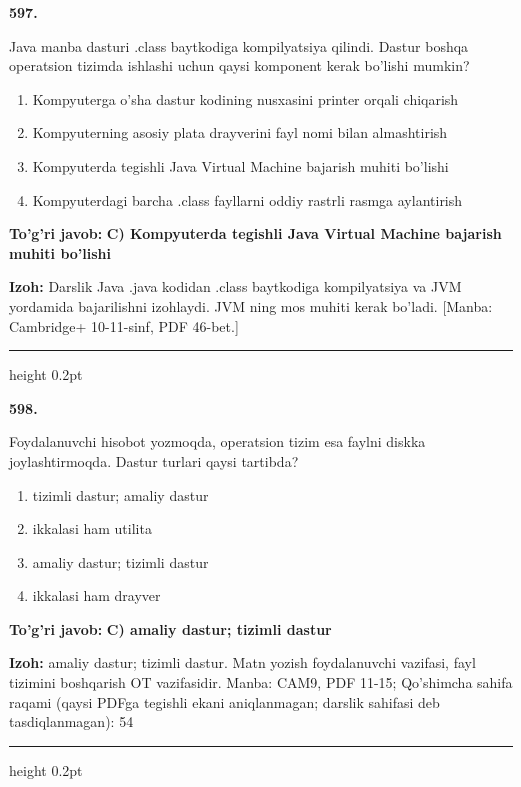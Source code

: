 \documentclass[10pt,a4paper]{article}
\begin{document}
{\bfseries\sffamily\color{ink} 597.}
\par
Java manba dasturi .class baytkodiga kompilyatsiya qilindi. Dastur boshqa operatsion tizimda ishlashi uchun qaysi komponent kerak bo'lishi mumkin?
\begin{enumerate}[label=\Alph*),leftmargin=9mm]
\item Kompyuterga o'sha dastur kodining nusxasini printer orqali chiqarish
\item Kompyuterning asosiy plata drayverini fayl nomi bilan almashtirish
\item Kompyuterda tegishli Java Virtual Machine bajarish muhiti bo'lishi
\item Kompyuterdagi barcha .class fayllarni oddiy rastrli rasmga aylantirish
\end{enumerate}
\begin{tcolorbox}[enhanced,breakable,colback=teal!4,colframe=teal!60!black,boxrule=0.45pt,arc=1.2mm,left=2.7mm,right=2.7mm,top=1.8mm,bottom=1.8mm,before skip=2mm,after skip=2mm]
{\bfseries\sffamily\color{teal}To'g'ri javob:} \textbf{C) Kompyuterda tegishli Java Virtual Machine bajarish muhiti bo'lishi}
\par\smallskip
{\bfseries Izoh:} Darslik Java .java kodidan .class baytkodiga kompilyatsiya va JVM yordamida bajarilishni izohlaydi. JVM ning mos muhiti kerak bo'ladi. [Manba: Cambridge+ 10-11-sinf, PDF 46-bet.]
\end{tcolorbox}
\vspace{2mm}\hrule height 0.2pt\vspace{3mm}

{\bfseries\sffamily\color{ink} 598.}
\par
Foydalanuvchi hisobot yozmoqda, operatsion tizim esa faylni diskka joylashtirmoqda. Dastur turlari qaysi tartibda?
\begin{enumerate}[label=\Alph*),leftmargin=9mm]
\item tizimli dastur; amaliy dastur
\item ikkalasi ham utilita
\item amaliy dastur; tizimli dastur
\item ikkalasi ham drayver
\end{enumerate}
\begin{tcolorbox}[enhanced,breakable,colback=teal!4,colframe=teal!60!black,boxrule=0.45pt,arc=1.2mm,left=2.7mm,right=2.7mm,top=1.8mm,bottom=1.8mm,before skip=2mm,after skip=2mm]
{\bfseries\sffamily\color{teal}To'g'ri javob:} \textbf{C) amaliy dastur; tizimli dastur}
\par\smallskip
{\bfseries Izoh:} amaliy dastur; tizimli dastur. Matn yozish foydalanuvchi vazifasi, fayl tizimini boshqarish OT vazifasidir. Manba: CAM9, PDF 11-15; Qo'shimcha sahifa raqami (qaysi PDFga tegishli ekani aniqlanmagan; darslik sahifasi deb tasdiqlanmagan): 54
\end{tcolorbox}
\vspace{2mm}\hrule height 0.2pt\vspace{3mm}
\end{document}
